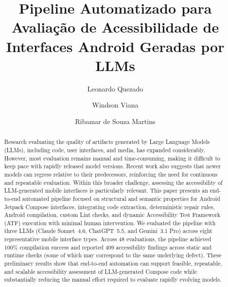 \documentclass[sigconf,anonymous,review]{webmedia}
\title{Pipeline Automatizado para Avaliação de Acessibilidade de Interfaces Android Geradas por LLMs}
\author{Leonardo Quezado}
\affiliation{%
  \institution{Universidade Federal do Ceará}
  \city{Fortaleza}
  \country{Brazil}
}
\author{Windson Viana}
\affiliation{%
  \institution{Universidade Federal do Ceará}
  \city{Fortaleza}
  \country{Brazil}
}
\author{Ribamar de Souza Martins}
\affiliation{%
  \institution{Universidade Federal do Ceará}
  \city{Fortaleza}
  \country{Brazil}
}
\begin{document}
\begin{abstract}
Research evaluating the quality of artifacts generated by Large Language
Models (LLMs), including code, user interfaces, and media, has expanded
considerably. However, most evaluation remains manual and time-consuming,
making it difficult to keep pace with rapidly released model versions. Recent
work also suggests that newer models can regress relative to their predecessors,
reinforcing the need for continuous and repeatable evaluation. Within this
broader challenge, assessing the accessibility of LLM-generated mobile
interfaces is particularly relevant. This paper presents an end-to-end
automated pipeline focused on structural and semantic properties for Android Jetpack Compose interfaces, integrating code
extraction, deterministic repair rules, Android compilation, custom Lint
checks, and dynamic Accessibility Test Framework (ATF) execution with minimal
human intervention. We evaluated the pipeline with three LLMs (Claude
Sonnet~4.6, ChatGPT~5.5, and Gemini~3.1 Pro) across eight representative
mobile interface types. Across 48 evaluations, the pipeline achieved 100\%
compilation success and reported 409 accessibility findings across static
and runtime checks (some of which may correspond to the same underlying
defect). These preliminary results show that end-to-end automation can
support feasible, repeatable, and scalable accessibility assessment of
LLM-generated Compose code while substantially reducing the manual effort
required to evaluate rapidly evolving models.
\end{abstract}

\maketitle
\end{document}
